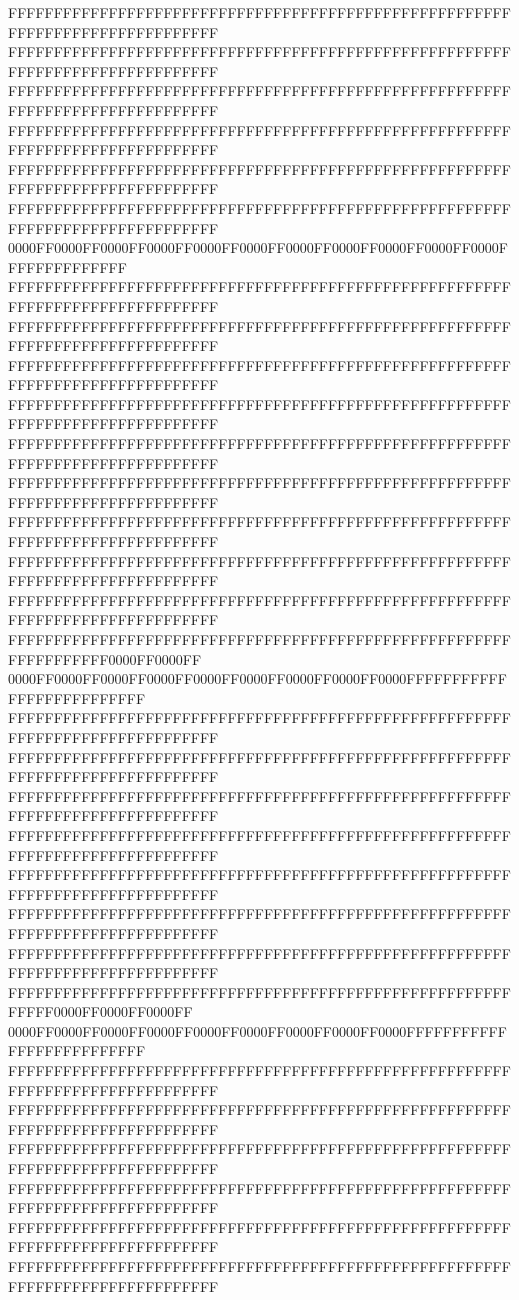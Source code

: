 FFFFFFFFFFFFFFFFFFFFFFFFFFFFFFFFFFFFFFFFFFFFFFFFFFFFFFFFFFFFFFFFFFFFFFFFFFFFFF
FFFFFFFFFFFFFFFFFFFFFFFFFFFFFFFFFFFFFFFFFFFFFFFFFFFFFFFFFFFFFFFFFFFFFFFFFFFFFF
FFFFFFFFFFFFFFFFFFFFFFFFFFFFFFFFFFFFFFFFFFFFFFFFFFFFFFFFFFFFFFFFFFFFFFFFFFFFFF
FFFFFFFFFFFFFFFFFFFFFFFFFFFFFFFFFFFFFFFFFFFFFFFFFFFFFFFFFFFFFFFFFFFFFFFFFFFFFF
FFFFFFFFFFFFFFFFFFFFFFFFFFFFFFFFFFFFFFFFFFFFFFFFFFFFFFFFFFFFFFFFFFFFFFFFFFFFFF
FFFFFFFFFFFFFFFFFFFFFFFFFFFFFFFFFFFFFFFFFFFFFFFFFFFFFFFFFFFFFFFFFFFFFFFFFFFFFF
0000FF0000FF0000FF0000FF0000FF0000FF0000FF0000FF0000FF0000FF0000FFFFFFFFFFFFFF
FFFFFFFFFFFFFFFFFFFFFFFFFFFFFFFFFFFFFFFFFFFFFFFFFFFFFFFFFFFFFFFFFFFFFFFFFFFFFF
FFFFFFFFFFFFFFFFFFFFFFFFFFFFFFFFFFFFFFFFFFFFFFFFFFFFFFFFFFFFFFFFFFFFFFFFFFFFFF
FFFFFFFFFFFFFFFFFFFFFFFFFFFFFFFFFFFFFFFFFFFFFFFFFFFFFFFFFFFFFFFFFFFFFFFFFFFFFF
FFFFFFFFFFFFFFFFFFFFFFFFFFFFFFFFFFFFFFFFFFFFFFFFFFFFFFFFFFFFFFFFFFFFFFFFFFFFFF
FFFFFFFFFFFFFFFFFFFFFFFFFFFFFFFFFFFFFFFFFFFFFFFFFFFFFFFFFFFFFFFFFFFFFFFFFFFFFF
FFFFFFFFFFFFFFFFFFFFFFFFFFFFFFFFFFFFFFFFFFFFFFFFFFFFFFFFFFFFFFFFFFFFFFFFFFFFFF
FFFFFFFFFFFFFFFFFFFFFFFFFFFFFFFFFFFFFFFFFFFFFFFFFFFFFFFFFFFFFFFFFFFFFFFFFFFFFF
FFFFFFFFFFFFFFFFFFFFFFFFFFFFFFFFFFFFFFFFFFFFFFFFFFFFFFFFFFFFFFFFFFFFFFFFFFFFFF
FFFFFFFFFFFFFFFFFFFFFFFFFFFFFFFFFFFFFFFFFFFFFFFFFFFFFFFFFFFFFFFFFFFFFFFFFFFFFF
FFFFFFFFFFFFFFFFFFFFFFFFFFFFFFFFFFFFFFFFFFFFFFFFFFFFFFFFFFFFFFFFFF0000FF0000FF
0000FF0000FF0000FF0000FF0000FF0000FF0000FF0000FF0000FFFFFFFFFFFFFFFFFFFFFFFFFF
FFFFFFFFFFFFFFFFFFFFFFFFFFFFFFFFFFFFFFFFFFFFFFFFFFFFFFFFFFFFFFFFFFFFFFFFFFFFFF
FFFFFFFFFFFFFFFFFFFFFFFFFFFFFFFFFFFFFFFFFFFFFFFFFFFFFFFFFFFFFFFFFFFFFFFFFFFFFF
FFFFFFFFFFFFFFFFFFFFFFFFFFFFFFFFFFFFFFFFFFFFFFFFFFFFFFFFFFFFFFFFFFFFFFFFFFFFFF
FFFFFFFFFFFFFFFFFFFFFFFFFFFFFFFFFFFFFFFFFFFFFFFFFFFFFFFFFFFFFFFFFFFFFFFFFFFFFF
FFFFFFFFFFFFFFFFFFFFFFFFFFFFFFFFFFFFFFFFFFFFFFFFFFFFFFFFFFFFFFFFFFFFFFFFFFFFFF
FFFFFFFFFFFFFFFFFFFFFFFFFFFFFFFFFFFFFFFFFFFFFFFFFFFFFFFFFFFFFFFFFFFFFFFFFFFFFF
FFFFFFFFFFFFFFFFFFFFFFFFFFFFFFFFFFFFFFFFFFFFFFFFFFFFFFFFFFFFFFFFFFFFFFFFFFFFFF
FFFFFFFFFFFFFFFFFFFFFFFFFFFFFFFFFFFFFFFFFFFFFFFFFFFFFFFFFFFF0000FF0000FF0000FF
0000FF0000FF0000FF0000FF0000FF0000FF0000FF0000FF0000FFFFFFFFFFFFFFFFFFFFFFFFFF
FFFFFFFFFFFFFFFFFFFFFFFFFFFFFFFFFFFFFFFFFFFFFFFFFFFFFFFFFFFFFFFFFFFFFFFFFFFFFF
FFFFFFFFFFFFFFFFFFFFFFFFFFFFFFFFFFFFFFFFFFFFFFFFFFFFFFFFFFFFFFFFFFFFFFFFFFFFFF
FFFFFFFFFFFFFFFFFFFFFFFFFFFFFFFFFFFFFFFFFFFFFFFFFFFFFFFFFFFFFFFFFFFFFFFFFFFFFF
FFFFFFFFFFFFFFFFFFFFFFFFFFFFFFFFFFFFFFFFFFFFFFFFFFFFFFFFFFFFFFFFFFFFFFFFFFFFFF
FFFFFFFFFFFFFFFFFFFFFFFFFFFFFFFFFFFFFFFFFFFFFFFFFFFFFFFFFFFFFFFFFFFFFFFFFFFFFF
FFFFFFFFFFFFFFFFFFFFFFFFFFFFFFFFFFFFFFFFFFFFFFFFFFFFFFFFFFFFFFFFFFFFFFFFFFFFFF
